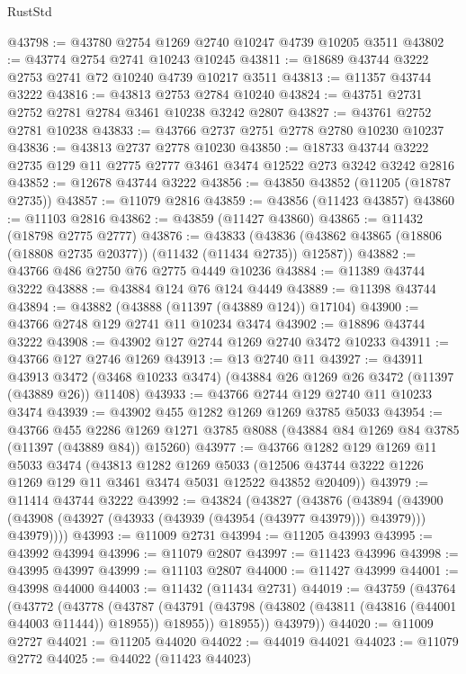 \begin{lexlean}{RustStd}
\begin{coremodule}
@43798 := @43780 @2754 @1269 @2740 @10247 @4739 @10205 @3511
@43802 := @43774 @2754 @2741 @10243 @10245
@43811 := @18689 @43744 @3222 @2753 @2741 @72 @10240 @4739 @10217 @3511
@43813 := @11357 @43744 @3222
@43816 := @43813 @2753 @2784 @10240
@43824 := @43751 @2731 @2752 @2781 @2784 @3461 @10238 @3242 @2807
@43827 := @43761 @2752 @2781 @10238
@43833 := @43766 @2737 @2751 @2778 @2780 @10230 @10237
@43836 := @43813 @2737 @2778 @10230
@43850 := @18733 @43744 @3222 @2735 @129 @11 @2775 @2777 @3461 @3474 @12522 @273 @3242 @3242 @2816
@43852 := @12678 @43744 @3222
@43856 := @43850 @43852 (@11205 (@18787 @2735))
@43857 := @11079 @2816
@43859 := @43856 (@11423 @43857)
@43860 := @11103 @2816
@43862 := @43859 (@11427 @43860)
@43865 := @11432 (@18798 @2775 @2777)
@43876 := @43833
    (@43836 (@43862 @43865 (@18806 (@18808 @2735 @20377)) (@11432 (@11434 @2735)) @12587))
@43882 := @43766 @486 @2750 @76 @2775 @4449 @10236
@43884 := @11389 @43744 @3222
@43888 := @43884 @124 @76 @124 @4449
@43889 := @11398 @43744
@43894 := @43882 (@43888 (@11397 (@43889 @124)) @17104)
@43900 := @43766 @2748 @129 @2741 @11 @10234 @3474
@43902 := @18896 @43744 @3222
@43908 := @43902 @127 @2744 @1269 @2740 @3472 @10233
@43911 := @43766 @127 @2746 @1269
@43913 := @13 @2740 @11
@43927 := @43911
    @43913
    @3472
    (@3468 @10233 @3474)
    (@43884 @26 @1269 @26 @3472 (@11397 (@43889 @26)) @11408)
@43933 := @43766 @2744 @129 @2740 @11 @10233 @3474
@43939 := @43902 @455 @1282 @1269 @1269 @3785 @5033
@43954 := @43766
    @455
    @2286
    @1269
    @1271
    @3785
    @8088
    (@43884 @84 @1269 @84 @3785 (@11397 (@43889 @84)) @15260)
@43977 := @43766
    @1282
    @129
    @1269
    @11
    @5033
    @3474
    (@43813
      @1282
      @1269
      @5033
      (@12506 @43744 @3222 @1226 @1269 @129 @11 @3461 @3474 @5031 @12522 @43852 @20409))
@43979 := @11414 @43744 @3222
@43992 := @43824
    (@43827
      (@43876
        (@43894
          (@43900 (@43908 (@43927 (@43933 (@43939 (@43954 (@43977 @43979))) @43979))) @43979))))
@43993 := @11009 @2731
@43994 := @11205 @43993
@43995 := @43992 @43994
@43996 := @11079 @2807
@43997 := @11423 @43996
@43998 := @43995 @43997
@43999 := @11103 @2807
@44000 := @11427 @43999
@44001 := @43998 @44000
@44003 := @11432 (@11434 @2731)
@44019 := @43759
    (@43764
      (@43772
        (@43778
          (@43787
            (@43791 (@43798 (@43802 (@43811 (@43816 (@44001 @44003 @11444)) @18955)) @18955))
            @18955))
        @43979))
@44020 := @11009 @2727
@44021 := @11205 @44020
@44022 := @44019 @44021
@44023 := @11079 @2772
@44025 := @44022 (@11423 @44023)

\end{coremodule}
\end{lexlean}
